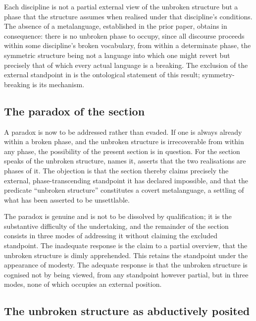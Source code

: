 \begin{claim}
Each discipline is not a partial external view of the unbroken structure but a phase that the structure assumes when realised under that discipline's conditions. The absence of a metalanguage, established in the prior paper, obtains in consequence: there is no unbroken phase to occupy, since all discourse proceeds within some discipline's broken vocabulary, from within a determinate phase, the symmetric structure being not a language into which one might revert but precisely that of which every actual language is a breaking. The exclusion of the external standpoint in  is the ontological statement of this result; symmetry-breaking is its mechanism.
\end{claim}

\subsection{The paradox of the section}
\label{p10:sec:paradox-met}

A paradox is now to be addressed rather than evaded. If one is always already within a broken phase, and the unbroken structure is irrecoverable from within any phase, the possibility of the present section is in question. For the section speaks of the unbroken structure, names it, asserts that the two realisations are phases of it. The objection is that the section thereby claims precisely the external, phase-transcending standpoint it has declared impossible, and that the predicate ``unbroken structure'' constitutes a covert metalanguage, a settling of what has been asserted to be unsettlable.

The paradox is genuine and is not to be dissolved by qualification; it is the substantive difficulty of the undertaking, and the remainder of the section consists in three modes of addressing it without claiming the excluded standpoint. The inadequate response is the claim to a partial overview, that the unbroken structure is dimly apprehended. This retains the standpoint under the appearance of modesty. The adequate response is that the unbroken structure is cognised not by being viewed, from any standpoint however partial, but in three modes, none of which occupies an external position.

\subsection{The unbroken structure as abductively posited}
\label{p10:sec:abduction}

